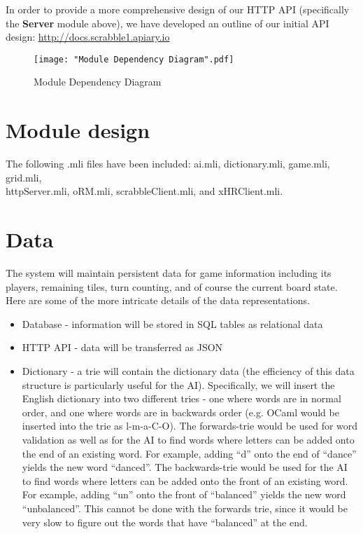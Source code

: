 \documentclass[2pt]{journal}
\begin{document}
In order to provide a more comprehensive design of our HTTP API (specifically the \textbf{Server} module above), we have developed an outline of our initial API design: \url{http://docs.scrabble1.apiary.io}

\begin{figure}[h]
\center
\texttt{[image: "Module Dependency Diagram".pdf]}
\caption{Module Dependency Diagram}
\end{figure}

\newpage

\section{Module design} The following .mli files have been included: ai.mli, dictionary.mli, game.mli, grid.mli, \\ httpServer.mli, oRM.mli, scrabbleClient.mli, and xHRClient.mli.

\section{Data}

The system will maintain persistent data for game information including its players, remaining tiles, turn counting, and of course the current board state. Here are some of the more intricate details of the data representations.

\begin{itemize}
    \item Database - information will be stored in SQL tables as relational data
    \item HTTP API - data will be transferred as JSON
    \item Dictionary - a trie will contain the dictionary data (the efficiency of this data structure is particularly useful for the AI). Specifically, we will insert the English dictionary into two different tries - one where words are in normal order, and one where words are in backwards order (e.g. OCaml would be inserted into the trie as l-m-a-C-O). The forwards-trie would be used for word validation as well as for the AI to find words where letters can be added onto the end of an existing word. For example, adding ``d'' onto the end of ``dance'' yields the new word ``danced''. The backwards-trie would be used for the AI to find words where letters can be added onto the front of an existing word. For example, adding ``un'' onto the front of ``balanced'' yields the new word ``unbalanced''. This cannot be done with the forwards trie, since it would be very slow to figure out the words that have ``balanced'' at the end.
\end{itemize}
\end{document}
